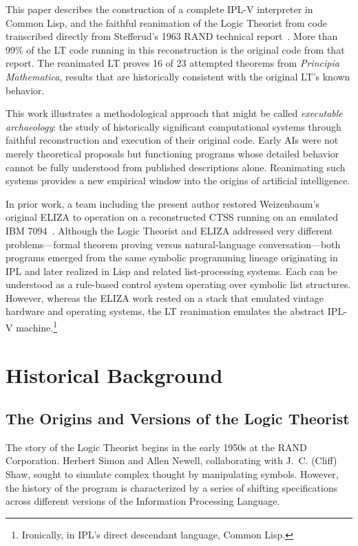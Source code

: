 \documentclass[journal]{IEEEtran}
\begin{document}
This paper describes the construction of a complete IPL-V interpreter
in Common Lisp, and the faithful reanimation of the Logic Theorist
from code transcribed directly from Stefferud's 1963 RAND technical
report~\cite{stefferud1963lt}. More than 99\% of the LT code running
in this reconstruction is the original code from that report. The
reanimated LT proves 16 of 23 attempted theorems from
\textit{Principia Mathematica}, results that are historically
consistent with the original LT's known behavior.

This work illustrates a methodological approach that might be called
\emph{executable archaeology}: the study of historically significant
computational systems through faithful reconstruction and execution of
their original code. Early AIs were not merely theoretical proposals
but functioning programs whose detailed behavior cannot be fully
understood from published descriptions alone. Reanimating such systems
provides a new empirical window into the origins of artificial
intelligence.

In prior work, a team including the present author restored
Weizenbaum's original ELIZA to operation on a reconstructed CTSS
running on an emulated IBM 7094~\cite{lane2025eliza}. Although the
Logic Theorist and ELIZA addressed very different problems---formal
theorem proving versus natural-language conversation---both programs
emerged from the same symbolic programming lineage originating in IPL
and later realized in Lisp and related list-processing systems. Each
can be understood as a rule-based control system operating over
symbolic list structures. However, whereas the ELIZA work rested on a
stack that emulated vintage hardware and operating systems, the LT
reanimation emulates the abstract IPL-V machine.\footnote{Ironically, in
IPL's direct descendant language, Common Lisp.}

\section{Historical Background}
\label{sec:history}

\subsection{The Origins and Versions of the Logic Theorist}

The story of the Logic Theorist begins in the early 1950s at the RAND
Corporation.  Herbert Simon and Allen Newell, collaborating with
J.~C. (Cliff) Shaw, sought to simulate complex thought by manipulating
symbols.  However, the history of the program is characterized by a
series of shifting specifications across different versions of the
Information Processing Language.
\end{document}
